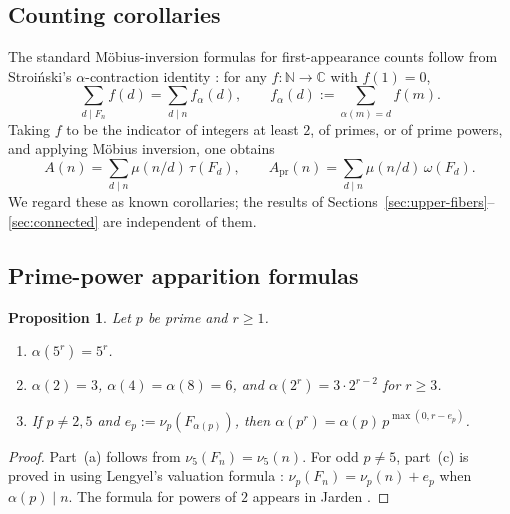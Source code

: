 \documentclass[11pt,letterpaper]{article}
\numberwithin{equation}{section}
\theoremstyle{plain}
\newtheorem{proposition}[theorem]{Proposition}
\theoremstyle{definition}
\theoremstyle{remark}
\newcommand{\NN}{\mathbb{N}}
\begin{document}
\subsection{Counting corollaries}\label{subsec:counting}

The standard M\"obius-inversion formulas for first-appearance counts follow
from Stroi\'nski's $\alpha$-contraction identity
\cite{Stroinski2016AlphaContraction}: for any $f:\NN\to\mathbb{C}$ with
$f(1)=0$,
\begin{equation}\label{eq:stroinski}
\sum_{d\mid F_n}f(d)=\sum_{d\mid n}f_\alpha(d),
\qquad
f_\alpha(d):=\sum_{\alpha(m)=d}f(m).
\end{equation}
Taking $f$ to be the indicator of integers at least $2$, of primes, or of
prime powers, and applying M\"obius inversion, one obtains
\begin{equation}\label{eq:mobius-birth}
A(n)=\sum_{d\mid n}\mu(n/d)\,\tau(F_d),
\qquad
A_{\mathrm{pr}}(n)=\sum_{d\mid n}\mu(n/d)\,\omega(F_d).
\end{equation}
We regard these as known corollaries; the results of
Sections~\ref{sec:upper-fibers}--\ref{sec:connected} are independent of them.

\subsection{Prime-power apparition formulas}\label{subsec:prime-power}

\begin{proposition}\label{prop:prime-power-ladders}
Let $p$ be prime and $r\ge 1$.
\begin{enumerate}[label=\textup{(\alph*)}]
\item $\alpha(5^r)=5^r$.
\item $\alpha(2)=3$, $\alpha(4)=\alpha(8)=6$, and
$\alpha(2^r)=3\cdot 2^{r-2}$ for $r\ge 3$.
\item If $p\neq 2,5$ and $e_p:=\nu_p(F_{\alpha(p)})$, then
$\alpha(p^r)=\alpha(p)\,p^{\max(0,r-e_p)}$.
\end{enumerate}
\end{proposition}

\begin{proof}
Part~(a) follows from $\nu_5(F_n)=\nu_5(n)$. For odd $p\neq 5$, part~(c) is
proved in \cite{FultonMorris1969ArithmeticalFunctions} using Lengyel's
valuation formula \cite{Lengyel1995OrderFibonacciLucas}:
$\nu_p(F_n)=\nu_p(n)+e_p$ when $\alpha(p)\mid n$. The formula for powers of
$2$ appears in Jarden \cite{Jarden1966RecurringSequences}.
\end{proof}
\end{document}
